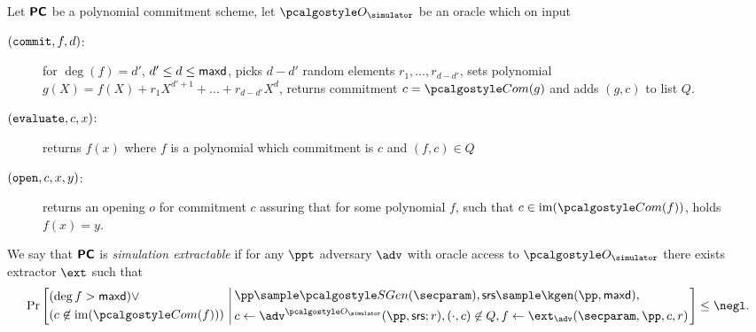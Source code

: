 \documentclass[runningheads,11pt]{llncs}
\begin{document}
\begin{definition}
  \label{def:sepcom}
  Let $\bm{\mathsf{PC}}$ be a polynomial commitment scheme, let $\oracles$ be an 
  oracle which on input
  \begin{description}
\item[$(\mathtt{commit}, f, d)$:] for $\deg(f) = d'$, $d' \leq d \leq \mathsf{maxd}$,
  picks $d - d'$ random elements $r_1, \ldots, r_{d - d'}$, sets 
  polynomial $g(X) = f(X) + r_1 X^{d' + 1} + \ldots + r_{d - d'} X^{d}$, returns
  commitment $c = \com(g)$ and adds $(g, c)$ to list $Q$.
  \item[$(\mathtt{evaluate}, c, x)$:] returns $f(x)$ where $f$ is a polynomial
    which commitment is $c$ and $(f, c) \in Q$
  \item[$(\mathtt{open}, c, x, y)$:] returns an opening $o$ for commitment
    $c$ assuring that for some polynomial $f$, such that $c \in \image(\com(f))$, holds $f(x) = y$.
  \end{description}
  We say that $\bm{\mathsf{PC}}$ is \emph{simulation extractable} if for any $\ppt$
  adversary $\adv$ with oracle access to $\oracles$ there exists extractor
  $\ext$ such that
  \[
    \Pr\left[
      \begin{aligned}
        & (\deg{f} > \maxdeg) \lor\\
        & (c \not\in \image(\com(f)))
        \end{aligned}
        \,\left|\,
          \begin{aligned}
          & \pp \sample \sgen(\secparam),
           \srs \sample \kgen(\pp, \maxdeg),\\
           & c \gets \adv^{\oracles}(\pp, \srs; r),
           (\cdot, c) \not\in Q, 
           f \gets \ext_{\adv}(\secparam, \pp, c, r)
        \end{aligned}
      \right.  \right] \leq \negl.
  \]
  
\end{definition}
\end{document}

